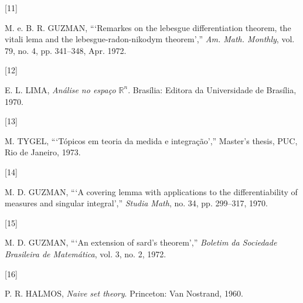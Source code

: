 \documentclass[
]{book}
\newlength{\cslhangindent}
\newlength{\csllabelwidth}
\newenvironment{CSLReferences}[2] %
 {\begin{list}{}{%
  \setlength{\itemindent}{0pt}
  \setlength{\leftmargin}{0pt}
  \setlength{\parsep}{0pt}
  \ifodd #1
   \setlength{\leftmargin}{\cslhangindent}
   \setlength{\itemindent}{-1\cslhangindent}
  \fi
  \setlength{\itemsep}{#2\baselineskip}}}
 {\end{list}}
\newcommand{\CSLLeftMargin}[1]{\parbox[t]{\csllabelwidth}{\strut#1\strut}}
\newcommand{\CSLRightInline}[1]{\parbox[t]{\linewidth - \csllabelwidth}{\strut#1\strut}}
\begin{document}
\begin{CSLReferences}{0}{0}
\CSLLeftMargin{{[}11{]} }%
\CSLRightInline{M. e. B. R. GUZMAN, {``{`Remarkes on the lebesgue differentiation theorem, the vitali lema and the lebesgue-radon-nikodym theorem'},''} \emph{Am. Math. Monthly}, vol. 79, no. 4, pp. 341--348, Apr. 1972.}

\CSLLeftMargin{{[}12{]} }%
\CSLRightInline{E. L. LIMA, \emph{Análise no espaço \(\mathbb{R}^n\)}. Brasília: Editora da Universidade de Brasília, 1970.}

\CSLLeftMargin{{[}13{]} }%
\CSLRightInline{M. TYGEL, {``{`Tópicos em teoria da medida e integração'},''} Master's thesis, PUC, Rio de Janeiro, 1973.}

\CSLLeftMargin{{[}14{]} }%
\CSLRightInline{M. D. GUZMAN, {``{`A covering lemma with applications to the differentiability of measures and singular integral'},''} \emph{Studia Math}, no. 34, pp. 299--317, 1970.}

\CSLLeftMargin{{[}15{]} }%
\CSLRightInline{M. D. GUZMAN, {``{`An extension of sard's theorem'},''} \emph{Boletim da Sociedade Brasileira de Matemática}, vol. 3, no. 2, 1972.}

\CSLLeftMargin{{[}16{]} }%
\CSLRightInline{P. R. HALMOS, \emph{Naive set theory}. Princeton: Van Nostrand, 1960.}

\end{CSLReferences}
\end{document}
